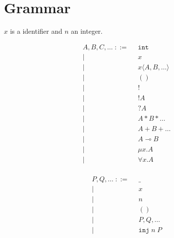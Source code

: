 \documentclass{scrartcl}
\begin{document}
\section{Grammar}

$x$ is a identifier and $n$ an integer.

\hspace{-2cm}
\begin{minipage}[t]{1cm}
  \begin{align*}
    A, B, C, \dots \; ::= \;\;
      & \mathtt{int}                  \\
    | & x                             \\
    | & x \langle A, B, \dots \rangle \\
    | & ()                            \\
    | & !                             \\
    | & !A                            \\
    | & ?A                            \\
    | & A * B * \dots                 \\
    | & A + B + \dots                 \\
    | & A \multimap B                 \\
    | & \mu x. A                      \\
    | & \forall x. A                  \\
  \end{align*}
\end{minipage}
\begin{minipage}[t]{3cm}
  \begin{align*}
    P, Q, \dots \; ::= \;\;
      & \_                 \\
    | & x                  \\
    | & n                  \\
    | & ()                 \\
    | & P, Q, \dots        \\
    | & \mathtt{inj}\;n\;P \\
  \end{align*}
\end{minipage}
\end{document}

